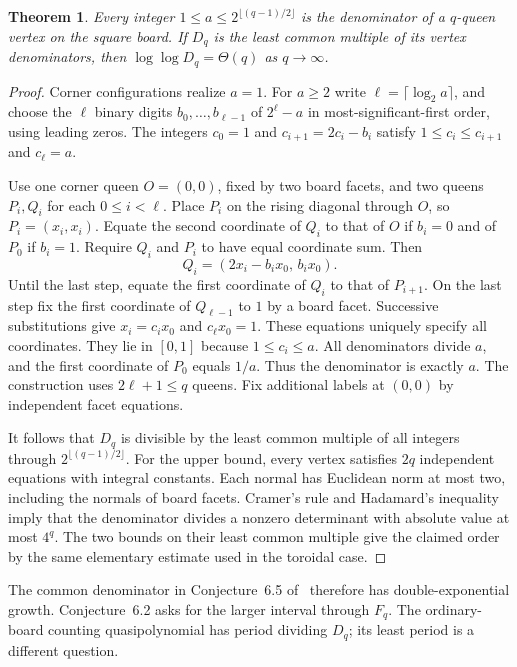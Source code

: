 \documentclass[10pt]{article}
\newtheorem{theorem}{Theorem}
\begin{document}
\begin{theorem}\label{thm:ordinary}
Every integer $1\le a\le 2^{\lfloor(q-1)/2\rfloor}$ is the denominator of a $q$-queen vertex on the square board. If $D_q$ is the least common multiple of its vertex denominators, then $\log\log D_q=\Theta(q)$ as $q\to\infty$.
\end{theorem}
\begin{proof}
Corner configurations realize $a=1$. For $a\ge2$ write $\ell=\lceil\log_2 a\rceil$, and choose the $\ell$ binary digits $b_0,\dots,b_{\ell-1}$ of $2^\ell-a$ in most-significant-first order, using leading zeros. The integers $c_0=1$ and $c_{i+1}=2c_i-b_i$ satisfy $1\le c_i\le c_{i+1}$ and $c_\ell=a$.

Use one corner queen $O=(0,0)$, fixed by two board facets, and two queens $P_i,Q_i$ for each $0\le i<\ell$. Place $P_i$ on the rising diagonal through $O$, so $P_i=(x_i,x_i)$. Equate the second coordinate of $Q_i$ to that of $O$ if $b_i=0$ and of $P_0$ if $b_i=1$. Require $Q_i$ and $P_i$ to have equal coordinate sum. Then
\[
Q_i=(2x_i-b_i x_0,\,b_i x_0).
\]
Until the last step, equate the first coordinate of $Q_i$ to that of $P_{i+1}$. On the last step fix the first coordinate of $Q_{\ell-1}$ to $1$ by a board facet. Successive substitutions give $x_i=c_i x_0$ and $c_\ell x_0=1$. These equations uniquely specify all coordinates. They lie in $[0,1]$ because $1\le c_i\le a$. All denominators divide $a$, and the first coordinate of $P_0$ equals $1/a$. Thus the denominator is exactly $a$. The construction uses $2\ell+1\le q$ queens. Fix additional labels at $(0,0)$ by independent facet equations.

It follows that $D_q$ is divisible by the least common multiple of all integers through $2^{\lfloor(q-1)/2\rfloor}$. For the upper bound, every vertex satisfies $2q$ independent equations with integral constants. Each normal has Euclidean norm at most two, including the normals of board facets. Cramer's rule and Hadamard's inequality imply that the denominator divides a nonzero determinant with absolute value at most $4^q$. The two bounds on their least common multiple give the claimed order by the same elementary estimate used in the toroidal case.
\end{proof}

The common denominator in Conjecture~6.5 of~\cite{chz} therefore has double-exponential growth. Conjecture~6.2 asks for the larger interval through $F_q$. The ordinary-board counting quasipolynomial has period dividing $D_q$; its least period is a different question.
\end{document}
